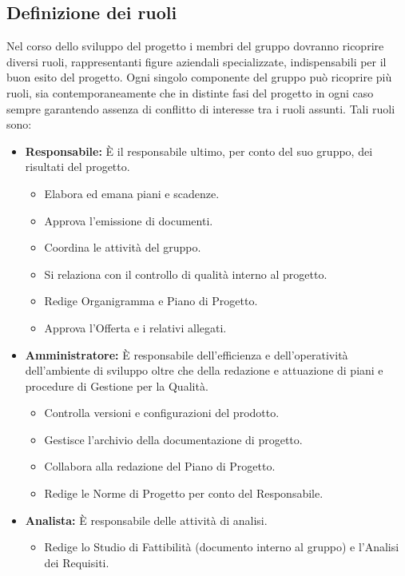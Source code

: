 \documentclass[a4paper]{report}
\begin{document}
\begin{appendices}
		\section{Definizione dei ruoli}
			Nel corso dello sviluppo del progetto i membri del gruppo dovranno ricoprire diversi ruoli, rappresentanti 
			figure aziendali specializzate, indispensabili per il buon esito del progetto. Ogni singolo componente del 
			gruppo può ricoprire più ruoli, sia contemporaneamente che in distinte fasi del progetto in ogni caso 
			sempre garantendo assenza di conflitto di interesse tra i ruoli assunti.
			Tali ruoli sono:
			\begin{itemize}
				\item \textbf{Responsabile:} È il responsabile ultimo, per conto del suo gruppo, dei risultati del progetto.
				\begin{itemize}
					\item Elabora ed emana piani e scadenze.
					\item Approva l'emissione di documenti.
					\item Coordina le attività del gruppo.
					\item Si relaziona con il controllo di qualità interno al progetto.
					\item Redige Organigramma e Piano di Progetto.
					\item Approva l'Offerta e i relativi allegati.
				\end{itemize}
				\item \textbf{Amministratore:} È responsabile dell'efficienza e dell'operatività dell'ambiente di sviluppo 
				oltre che della redazione e attuazione di piani e procedure di Gestione per la Qualità.
				\begin{itemize}
					\item Controlla versioni e configurazioni del prodotto. 
					\item Gestisce l'archivio della documentazione di progetto. 
					\item Collabora alla redazione del Piano di Progetto. 
					\item Redige le Norme di Progetto per conto del Responsabile.
				\end{itemize}
				\item \textbf{Analista:} È responsabile delle attività di analisi. 
				\begin{itemize}
					\item Redige lo Studio di Fattibilità (documento interno al gruppo) e l'Analisi dei Requisiti.
				\end{itemize}

\end{itemize}
\end{appendices}
\end{document}
